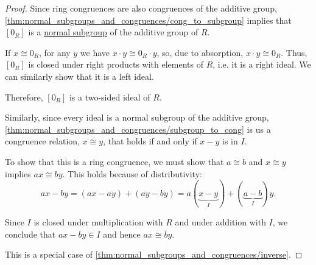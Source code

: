 \begin{proof}
   Since ring congruences are also congruences of the additive group, \cref{thm:normal_subgroups_and_congruences/cong_to_subgroup} implies that \( [0_R] \) is a \hyperref[def:normal_subgroup]{normal subgroup} of the additive group of \( R \).

  If \( x \cong 0_R \), for any \( y \) we have \( x \cdot y \cong 0_R \cdot y \), so, due to absorption, \( x \cdot y \cong 0_R \). Thus, \( [0_R] \) is closed under right products with elements of \( R \), i.e. it is a right ideal. We can similarly show that it is a left ideal.

  Therefore, \( [0_R] \) is a two-sided ideal of \( R \).

   Similarly, since every ideal is a normal subgroup of the additive group, \cref{thm:normal_subgroups_and_congruences/subgroup_to_cong} is us a congruence relation, \( x \cong y \), that holds if and only if \( x - y \) is in \( I \).

  To show that this is a ring congruence, we must show that \( a \cong b \) and \( x \cong y \) implies \( ax \cong by \). This holds because of distributivity:
  \begin{equation*}
    ax - by
    =
    (ax - ay) + (ay - by)
    =
    a(\underbrace{x - y}_{I}) + (\underbrace{a - b}_{I})y.
  \end{equation*}

  Since \( I \) is closed under multiplication with \( R \) and under addition with \( I \), we conclude that \( ax - by \in I \) and hence \( ax \cong by \).

   This is a special case of \cref{thm:normal_subgroups_and_congruences/inverse}.
\end{proof}

